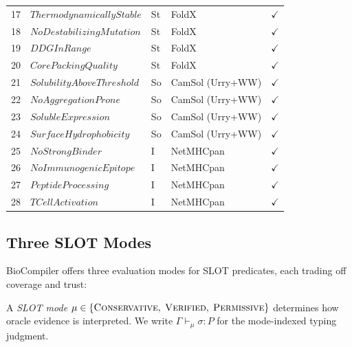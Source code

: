 \documentclass[acmsmall,review,anonymous]{acmart}
\newcommand{\seq}{\sigma}
\newcommand{\pred}{P}
\newcommand{\CONSERVATIVE}{\textsc{Conservative}\xspace}
\newcommand{\VERIFIED}{\textsc{Verified}\xspace}
\newcommand{\PERMISSIVE}{\textsc{Permissive}\xspace}
\newcommand{\mode}{\mu}
\newcommand{\evalmode}[4]{#1 \vdash_{#2} #3 : #4}
\begin{document}
\begin{table}[t]
\begin{tabular}{clllc}
17 & $\mathit{ThermodynamicallyStable}$ & St & FoldX                & $\checkmark$ \\
18 & $\mathit{NoDestabilizingMutation}$ & St & FoldX                & $\checkmark$ \\
19 & $\mathit{DDGInRange}$            & St  & FoldX                 & $\checkmark$ \\
20 & $\mathit{CorePackingQuality}$    & St  & FoldX                 & $\checkmark$ \\
\midrule
21 & $\mathit{SolubilityAboveThreshold}$ & So & CamSol (Urry+WW)   & $\checkmark$ \\
22 & $\mathit{NoAggregationProne}$    & So  & CamSol (Urry+WW)     & $\checkmark$ \\
23 & $\mathit{SolubleExpression}$     & So  & CamSol (Urry+WW)     & $\checkmark$ \\
24 & $\mathit{SurfaceHydrophobicity}$ & So  & CamSol (Urry+WW)     & $\checkmark$ \\
\midrule
25 & $\mathit{NoStrongBinder}$        & I   & NetMHCpan             & $\checkmark$ \\
26 & $\mathit{NoImmunogenicEpitope}$  & I   & NetMHCpan             & $\checkmark$ \\
27 & $\mathit{PeptideProcessing}$     & I   & NetMHCpan             & $\checkmark$ \\
28 & $\mathit{TCellActivation}$       & I   & NetMHCpan             & $\checkmark$ \\
\bottomrule
\end{tabular}
\end{table}

\subsection{Three SLOT Modes}\label{sec:slot-modes}

BioCompiler offers three evaluation modes for SLOT predicates, each
trading off coverage and trust:

\begin{definition}
A \emph{SLOT mode} $\mode \in \{\CONSERVATIVE,\; \VERIFIED,\;
\PERMISSIVE\}$ determines how oracle evidence is interpreted.
We write $\evalmode{\Gamma}{\mode}{\seq}{\pred}$ for the mode-indexed
typing judgment.
\end{definition}
\end{document}
